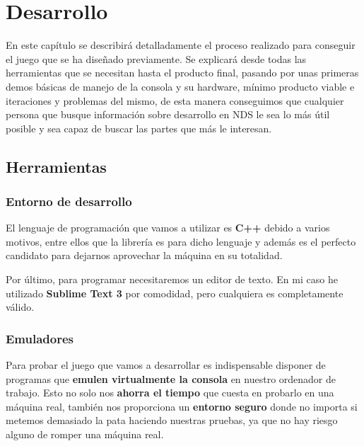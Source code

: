 
\chapter{Desarrollo} 

En este capítulo se describirá detalladamente el proceso realizado para conseguir el juego que se ha diseñado previamente. Se explicará desde todas las herramientas que se necesitan hasta el producto final, pasando por unas primeras demos básicas de manejo de la consola y su hardware, mínimo producto viable e iteraciones y problemas del mismo, de esta manera conseguimos que cualquier persona que busque información sobre desarrollo en NDS le sea lo más útil posible y sea capaz de buscar las partes que más le interesan.

\section{Herramientas}

\subsection{Entorno de desarrollo}

El lenguaje de programación que vamos a utilizar es \textbf{C++} debido a varios motivos, entre ellos que la librería es para dicho lenguaje y además es el perfecto candidato para dejarnos aprovechar la máquina en su totalidad.

\vspace{0.5cm}

Por último, para programar necesitaremos un editor de texto. En mi caso he utilizado \textbf{Sublime Text 3} por comodidad, pero cualquiera es completamente válido.

\subsection{Emuladores}

Para probar el juego que vamos a desarrollar es indispensable disponer de programas que \textbf{emulen virtualmente la consola} en nuestro ordenador de trabajo. Esto no solo nos \textbf{ahorra el tiempo} que cuesta en probarlo en una máquina real, también nos proporciona un \textbf{entorno seguro} donde no importa si metemos demasiado la pata haciendo nuestras pruebas, ya que no hay riesgo alguno de romper una máquina real.

